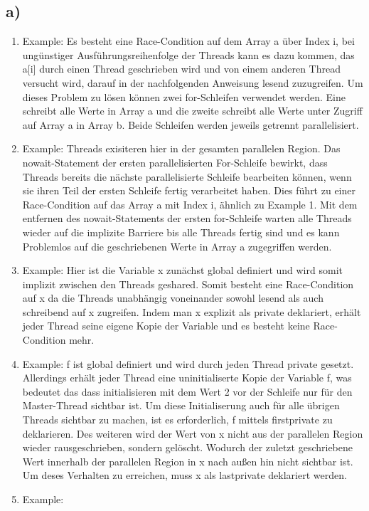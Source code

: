 \documentclass{article}
\begin{document}
    	\subsection{a)}
		\begin{enumerate}
			\item Example: Es besteht eine Race-Condition auf dem Array a über Index i,
				bei ungünstiger Ausführungsreihenfolge der Threads kann es dazu kommen,
				das a[i] durch einen Thread geschrieben wird und von einem anderen Thread versucht wird, darauf in der nachfolgenden Anweisung lesend zuzugreifen.
				Um dieses Problem zu lösen können zwei for-Schleifen verwendet werden.
				Eine schreibt alle Werte in Array a und die zweite schreibt alle Werte unter Zugriff auf Array a in Array b. 
				Beide Schleifen werden jeweils getrennt parallelisiert.
			\item Example: Threads exisiteren hier in der gesamten parallelen Region.
				Das nowait-Statement der ersten parallelisierten For-Schleife bewirkt, dass Threads bereits die nächste parallelisierte Schleife bearbeiten können, wenn sie ihren Teil der ersten Schleife fertig verarbeitet haben.
				Dies führt zu einer Race-Condition auf das Array a mit Index i, ähnlich zu Example 1.
				Mit dem entfernen des nowait-Statements der ersten for-Schleife warten alle Threads wieder auf die implizite Barriere bis alle Threads fertig sind und es kann Problemlos auf die geschriebenen Werte in Array a zugegriffen werden.
			\item Example: Hier ist die Variable x zunächst global definiert und wird somit implizit zwischen den Threads geshared. 
				Somit besteht eine Race-Condition auf x da die Threads unabhängig voneinander sowohl lesend als auch schreibend auf x zugreifen.
				Indem man x explizit als private deklariert, erhält jeder Thread seine eigene Kopie der Variable und es besteht keine Race-Condition mehr.
			\item Example: f ist global definiert und wird durch jeden Thread private gesetzt. 
				Allerdings erhält jeder Thread eine uninitialiserte Kopie der Variable f, was bedeutet das dass initialisieren mit dem Wert 2 vor der Schleife nur für den Master-Thread sichtbar ist.
				Um diese Initialiserung auch für alle übrigen Threads sichtbar zu machen, ist es erforderlich, f mittels firstprivate zu deklarieren.
				Des weiteren wird der Wert von x nicht aus der parallelen Region wieder rausgeschrieben, sondern gelöscht. 
				Wodurch der zuletzt geschriebene Wert innerhalb der parallelen Region in x nach außen hin nicht sichtbar ist.
				Um deses Verhalten zu erreichen, muss x als lastprivate deklariert werden.
			\item Example:

		\end{enumerate}
\end{document}
